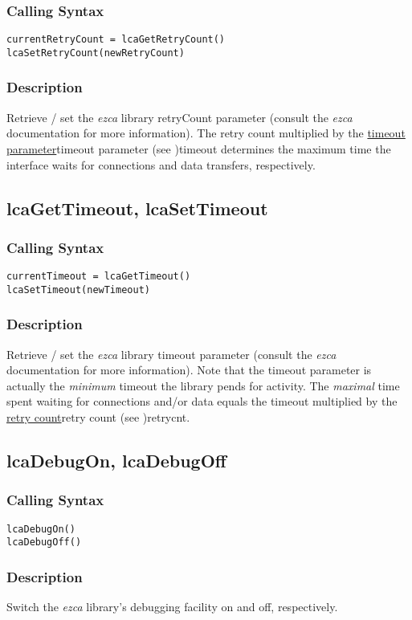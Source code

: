 \documentclass{article}
\newcommand{\ezca}{\ita{ezca}}
\newcommand{\ita}[1]{\emph{#1}}
\begin{document}
\subsubsection{Calling Syntax}
\begin{verbatim}
currentRetryCount = lcaGetRetryCount()
lcaSetRetryCount(newRetryCount)
\end{verbatim}
\subsubsection{Description}
Retrieve / set the \ezca{} library retryCount parameter (consult the \ezca{}
documentation for more information). The retry count multiplied by the
\hyperref[ref]{timeout parameter}{timeout parameter (see }{ )}{timeout}
determines the maximum time the interface waits for connections and data
transfers, respectively.

\subsection{lcaGetTimeout, lcaSetTimeout}
\label{timeout}
\subsubsection{Calling Syntax}
\begin{verbatim}
currentTimeout = lcaGetTimeout()
lcaSetTimeout(newTimeout)
\end{verbatim}
\subsubsection{Description}
Retrieve / set the \ezca{} library timeout parameter (consult the \ezca{}
documentation for more information). Note that the timeout parameter is
actually the {\em minimum} timeout the library pends for activity. The
{\em maximal} time spent waiting for connections and/or data equals the
timeout multiplied by the
\hyperref[ref]{retry count}{retry count (see }{ )}{retrycnt}.
\subsection{lcaDebugOn, lcaDebugOff}
\subsubsection{Calling Syntax}
\begin{verbatim}
lcaDebugOn()
lcaDebugOff()
\end{verbatim}
\subsubsection{Description}
Switch the \ezca{} library's debugging facility on and off, respectively.
\end{document}
